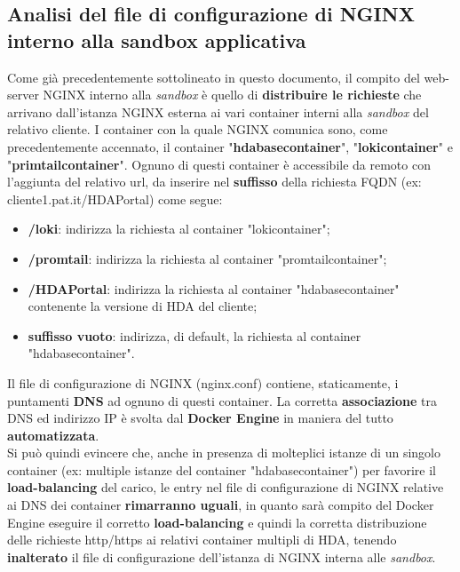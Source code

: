 \subsection{Analisi del file di configurazione di NGINX interno alla sandbox applicativa}
Come già precedentemente sottolineato in questo documento, il compito del web-server NGINX interno alla \textit{sandbox} è quello di \textbf{distribuire le richieste} che arrivano dall'istanza NGINX esterna ai vari container interni alla \textit{sandbox} del relativo cliente. I container con la quale NGINX comunica sono, come precedentemente accennato, il container "\textbf{hdabasecontainer}", "\textbf{lokicontainer}" e "\textbf{primtailcontainer}".
Ognuno di questi container è accessibile da remoto con l'aggiunta del relativo url, da inserire nel \textbf{suffisso} della richiesta FQDN (ex: cliente1.pat.it/HDAPortal) come segue:
\begin{itemize}
	\item \textbf{/loki}: indirizza la richiesta al container "lokicontainer";
	\item \textbf{/promtail}: indirizza la richiesta al container "promtailcontainer";
	\item \textbf{/HDAPortal}: indirizza la richiesta al container "hdabasecontainer" contenente la versione di HDA del cliente;
	\item \textbf{suffisso vuoto}: indirizza, di default, la richiesta al container "hdabasecontainer".
\end{itemize}
Il file di configurazione di NGINX (nginx.conf) contiene, staticamente, i puntamenti \textbf{DNS} ad ognuno di questi container. La corretta \textbf{associazione} tra DNS ed indirizzo IP è svolta dal \textbf{Docker Engine} in maniera del tutto \textbf{automatizzata}.\\
Si può quindi evincere che, anche in presenza di molteplici istanze di un singolo container (ex: multiple istanze del container "hdabasecontainer") per favorire il \textbf{load-balancing} del carico, le entry nel file di configurazione di NGINX relative ai DNS dei container \textbf{rimarranno uguali}, in quanto sarà compito del Docker Engine eseguire il corretto \textbf{load-balancing} e quindi la corretta distribuzione delle richieste http/https ai relativi container multipli di HDA, tenendo \textbf{inalterato} il file di configurazione dell'istanza di NGINX interna alle \textit{sandbox}.

